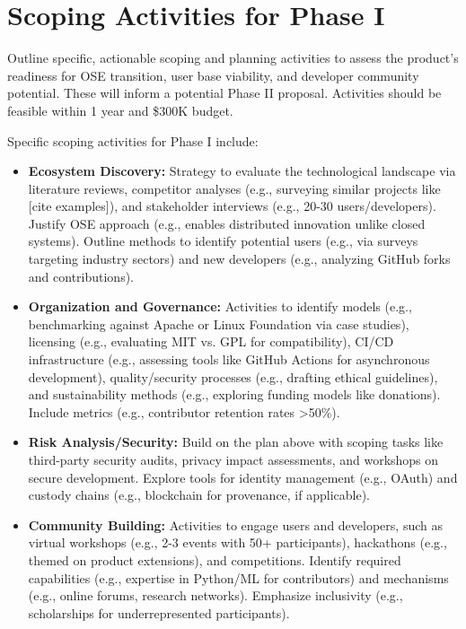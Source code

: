 \documentclass[11pt]{article}
\begin{document}
\section*{Scoping Activities for Phase I}
\vspace{-3pt}
\noindent
Outline specific, actionable scoping and planning activities to assess the product's readiness for OSE transition, user base viability, and developer community potential. These will inform a potential Phase II proposal. Activities should be feasible within 1 year and \$300K budget.
\vspace{-3pt}

\noindent
Specific scoping activities for Phase I include:
\vspace{-3pt}
\begin{itemize}
    \item \textbf{Ecosystem Discovery:} Strategy to evaluate the technological landscape via literature reviews, competitor analyses (e.g., surveying similar projects like [cite examples]), and stakeholder interviews (e.g., 20-30 users/developers). Justify OSE approach (e.g., enables distributed innovation unlike closed systems). Outline methods to identify potential users (e.g., via surveys targeting industry sectors) and new developers (e.g., analyzing GitHub forks and contributions).
    \item \textbf{Organization and Governance:} Activities to identify models (e.g., benchmarking against Apache or Linux Foundation via case studies), licensing (e.g., evaluating MIT vs. GPL for compatibility), CI/CD infrastructure (e.g., assessing tools like GitHub Actions for asynchronous development), quality/security processes (e.g., drafting ethical guidelines), and sustainability methods (e.g., exploring funding models like donations). Include metrics (e.g., contributor retention rates >50\%).
    \item \textbf{Risk Analysis/Security:} Build on the plan above with scoping tasks like third-party security audits, privacy impact assessments, and workshops on secure development. Explore tools for identity management (e.g., OAuth) and custody chains (e.g., blockchain for provenance, if applicable).
    \item \textbf{Community Building:} Activities to engage users and developers, such as virtual workshops (e.g., 2-3 events with 50+ participants), hackathons (e.g., themed on product extensions), and competitions. Identify required capabilities (e.g., expertise in Python/ML for contributors) and mechanisms (e.g., online forums, research networks). Emphasize inclusivity (e.g., scholarships for underrepresented participants).
\end{itemize}
\end{document}
